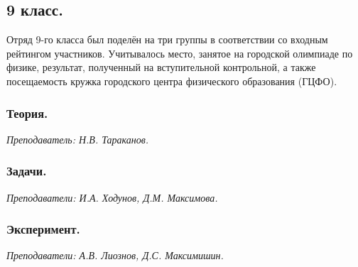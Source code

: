 \documentclass[12pt]{article}
\newlength{\h}
\newlength{\x}
\begin{document}
\clearpage

\restoregeometry


\subsection{9 класс.}
\label{sec:daily9}

Отряд 9-го класса был поделён на три группы в соответствии со входным
рейтингом участников. Учитывалось место, занятое на городской
олимпиаде по физике, результат, полученный на вступительной
контрольной, а также посещаемость кружка городского центра физического
образования (ГЦФО). 

\subsubsection{Теория.}
\label{sec:daily9th}

\textit{Преподаватель: Н.В. Тараканов.}\\

\subsubsection{Задачи.}
\label{sec:daily9pr}

\textit{Преподаватели: И.А. Ходунов, Д.М. Максимова.}\\

\subsubsection{Эксперимент.}
\label{sec:daily9exp}

\textit{Преподаватели: А.В. Лиознов, Д.С. Максимишин.}\\
\end{document}
